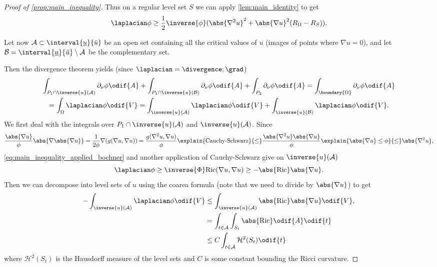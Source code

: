\documentclass[titlepage,numbers=noenddot,oneside,%
cleardoublepage=empty,paper=a4,fontsize=11pt,%
english,%
]{scrartcl}
\newcommand{\Ricci}{\mathrm{Ric}} %
\begin{document}
{\begin{proof}[Proof of \cref{prop:main_inequality}]
    Thus on a regular level set \( S \) we can apply \cref{lem:main_identity} to get
    \begin{equation}
        \laplacian \phi\geq \frac{1}{2}\inverse{\phi}(\abs{\nabla^2 u}^2+\abs{\nabla u}^2(R_\Omega-R_S)).\label{eq:main_inequality_applied_main_identity}
    \end{equation}

    Let now \( \mathcal{A}\subset \interval{\minu}{\maxu} \) be an open set containing all the critical values of \( u \) (images of points where \( \nabla u=0 \)), and let \( \mathcal{B}=\interval{\minu}{\maxu}\setminus \mathcal{A} \) be the complementary set.

    Then the divergence theorem yields (since \( \laplacian =\divergence;\grad \))
    \begin{multline}
        \int_{P_1\cap \inverse{u}(\mathcal{A})}\partial_\nu \phi\odif{A}+\int_{P_1\cap \inverse{u}(\mathcal{B})}\partial_\nu \phi\odif{A}+\int_{P_2}\partial_\nu \phi\odif{A}=\int_{\boundary{\Omega}}\partial_\nu \phi\odif{A}\\
        =\int_{\Omega}\laplacian \phi\odif{V}=\int_{\inverse{u}(\mathcal{A})}\laplacian \phi\odif{V}+\int_{\inverse{u}(\mathcal{B})}\laplacian \phi\odif{V}.\label{eq:main_inequality_branching_point}
    \end{multline}
    We first deal with the integrals over \( P_1\cap \inverse{u}(\mathcal{A}) \) and \( \inverse{u}(\mathcal{A}) \). Since
    \begin{equation*}
        \frac{\abs{\nabla u}}{\phi}\abs{\nabla \abs{\nabla u}}=\frac{1}{2\phi}\nabla(g(\nabla u,\nabla u))=\frac{g(\nabla^2 u,\nabla u)}{\phi}\explain{\text{Cauchy-Schwarz}}{\leq}\frac{\abs{\nabla^2 u}\abs{\nabla u}}{\phi}\explain{\abs{\nabla u}\leq \phi}{\leq} \abs{\nabla^2 u},
    \end{equation*}
    \cref{eq:main_inequality_applied_bochner} and another application of Cauchy-Schwarz give on \( \inverse{u}(\mathcal{A}) \)
    \begin{equation*}
        \laplacian\phi\geq \inverse{\Phi}\Ricci(\nabla u, \nabla u)\geq -\abs{\Ricci}\abs{\nabla u}.
    \end{equation*}
    Then we can decompose into level sets of \( u \) using the coarea formula (note that we need to divide by \( \abs{\nabla u} \)) to get
    \begin{equation*}
        \begin{aligned}[t]
            -\int_{\inverse{u}(\mathcal{A})}\laplacian\phi\odif{V}&\leq \int_{\inverse{u}(\mathcal{A})}\abs{\Ricci}\abs{\nabla u}\odif{V}\\ 
            &=\int_{t\in \mathcal{A}}\int_{S_t}\abs{\Ricci}\odif{A}\odif{t}\\
            &\leq C\int_{t\in \mathcal{A}}\mathcal{H}^2(S_t)\odif{t}
        \end{aligned},
    \end{equation*}
    where \( \mathcal{H}^2(S_t) \) is the Hausdorff measure of the level sets and \( C \) is some constant bounding the Ricci curvature.


\end{proof}}
\end{document}
